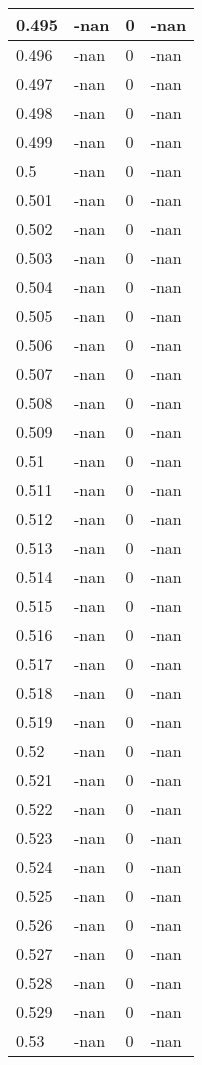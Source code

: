 \documentclass[a4paper,14pt]{extarticle}
\begin{document}
\begin{longtable}{||m{3cm}||m{3cm}|m{3cm}||m{3cm}||}
\hline
0.495 & -nan & 0 & -nan\\
\hline
0.496 & -nan & 0 & -nan\\
\hline
0.497 & -nan & 0 & -nan\\
\hline
0.498 & -nan & 0 & -nan\\
\hline
0.499 & -nan & 0 & -nan\\
\hline
0.5 & -nan & 0 & -nan\\
\hline
0.501 & -nan & 0 & -nan\\
\hline
0.502 & -nan & 0 & -nan\\
\hline
0.503 & -nan & 0 & -nan\\
\hline
0.504 & -nan & 0 & -nan\\
\hline
0.505 & -nan & 0 & -nan\\
\hline
0.506 & -nan & 0 & -nan\\
\hline
0.507 & -nan & 0 & -nan\\
\hline
0.508 & -nan & 0 & -nan\\
\hline
0.509 & -nan & 0 & -nan\\
\hline
0.51 & -nan & 0 & -nan\\
\hline
0.511 & -nan & 0 & -nan\\
\hline
0.512 & -nan & 0 & -nan\\
\hline
0.513 & -nan & 0 & -nan\\
\hline
0.514 & -nan & 0 & -nan\\
\hline
0.515 & -nan & 0 & -nan\\
\hline
0.516 & -nan & 0 & -nan\\
\hline
0.517 & -nan & 0 & -nan\\
\hline
0.518 & -nan & 0 & -nan\\
\hline
0.519 & -nan & 0 & -nan\\
\hline
0.52 & -nan & 0 & -nan\\
\hline
0.521 & -nan & 0 & -nan\\
\hline
0.522 & -nan & 0 & -nan\\
\hline
0.523 & -nan & 0 & -nan\\
\hline
0.524 & -nan & 0 & -nan\\
\hline
0.525 & -nan & 0 & -nan\\
\hline
0.526 & -nan & 0 & -nan\\
\hline
0.527 & -nan & 0 & -nan\\
\hline
0.528 & -nan & 0 & -nan\\
\hline
0.529 & -nan & 0 & -nan\\
\hline
0.53 & -nan & 0 & -nan\\

\end{longtable}
\end{document}
